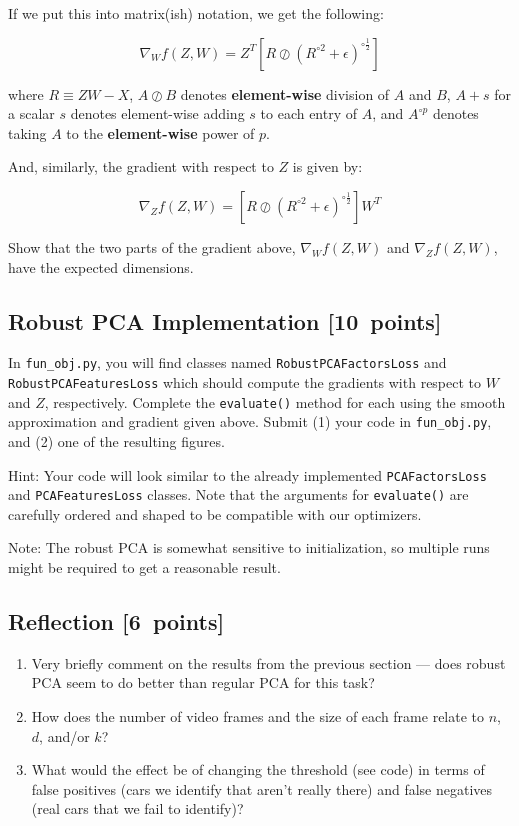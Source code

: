 \documentclass{article}
\newcommand{\blu}[1]{{\textcolor{blu}{#1}}}
\let\ask\blu
\newcommand\pts[1]{\textcolor{pointscolour}{[#1~points]}}
\begin{document}
If we put this into matrix(ish) notation, we get the following:

\[
\nabla_W f(Z,W) = Z^T \left[ R \oslash \left(R^{\circ 2} + \epsilon\right)^{\circ \frac12}  \right]
\]

where $R\equiv ZW-X$,
$A \oslash B$ denotes \textbf{element-wise} division of $A$ and $B$,
$A + s$ for a scalar $s$ denotes element-wise adding $s$ to each entry of $A$,
and $A^{\circ p}$ denotes taking $A$ to the \textbf{element-wise} power of $p$.

And, similarly, the gradient with respect to $Z$ is given by:

\[
\nabla_Z f(Z,W) = \left[ R \oslash \left(R^{\circ 2} + \epsilon\right)^{\circ \frac12} \right] W^T
\]

\ask{Show that the two parts of the gradient above, $\nabla_W f(Z,W)$ and $\nabla_Z f(Z,W)$, have the expected dimensions.}


\subsection{Robust PCA Implementation \pts{10}}

In \texttt{fun\_obj.py}, you will find classes named \texttt{RobustPCAFactorsLoss} and \texttt{RobustPCAFeaturesLoss} which should compute the gradients with respect to $W$ and $Z$, respectively. \ask{Complete the \texttt{evaluate()} method for each using the smooth approximation and gradient given above. Submit (1) your code in \texttt{fun\_obj.py}, and (2) one of the resulting figures.}

Hint: Your code will look similar to the already implemented \texttt{PCAFactorsLoss} and \texttt{PCAFeaturesLoss} classes. Note that the arguments for \texttt{evaluate()} are carefully ordered and shaped to be compatible with our optimizers.

Note: The robust PCA is somewhat sensitive to initialization, so multiple runs might be required to get a reasonable result.

\subsection{Reflection \pts{6}}

\begin{enumerate}
	\item Very briefly comment on the results from the previous section --- does robust PCA seem to do better than regular PCA for this task?
	\item How does the number of video frames and the size of each frame relate to $n$, $d$, and/or $k$?
	\item What would the effect be of changing the threshold (see code) in terms of false positives (cars we identify that aren't really there) and false negatives (real cars that we fail to identify)?
\end{enumerate}
\end{document}
